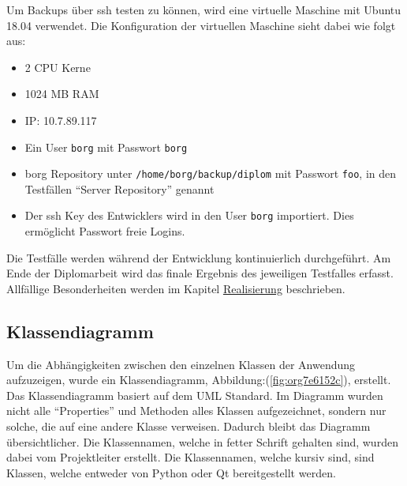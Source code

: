 Um Backups über \gls{ssh} testen zu können, wird eine virtuelle Maschine mit Ubuntu
18.04 verwendet. Die Konfiguration der virtuellen Maschine sieht dabei wie
folgt aus:
\begin{itemize}
\item 2 CPU Kerne
\item 1024 MB RAM
\item IP: 10.7.89.117
\item Ein User \texttt{borg} mit Passwort \texttt{borg}
\item \gls{borg} Repository unter \texttt{/home/borg/backup/diplom} mit Passwort \texttt{foo}, in
den Testfällen "`Server Repository"' genannt
\item Der \gls{ssh} Key des Entwicklers wird in den User \texttt{borg} importiert. Dies
ermöglicht Passwort freie Logins.
\end{itemize}

Die Testfälle werden während der Entwicklung kontinuierlich durchgeführt. Am
Ende der Diplomarbeit wird das finale Ergebnis des jeweiligen Testfalles
erfasst. Allfällige Besonderheiten werden im Kapitel \hyperref[sec:orgb833f22]{Realisierung}
beschrieben.

\subsection{Klassendiagramm}
\label{sec:orgd8ab406}

Um die Abhängigkeiten zwischen den einzelnen Klassen der Anwendung aufzuzeigen,
wurde ein Klassendiagramm, Abbildung:(\ref{fig:org7e6152c}), erstellt. Das
Klassendiagramm basiert auf dem UML Standard. Im Diagramm wurden nicht alle
"`Properties"' und Methoden alles Klassen aufgezeichnet, sondern nur solche, die
auf eine andere Klasse verweisen. Dadurch bleibt das Diagramm übersichtlicher.
Die Klassennamen, welche in fetter Schrift gehalten sind, wurden dabei vom
Projektleiter erstellt. Die Klassennamen, welche kursiv sind, sind Klassen, welche
entweder von Python oder Qt bereitgestellt werden.

